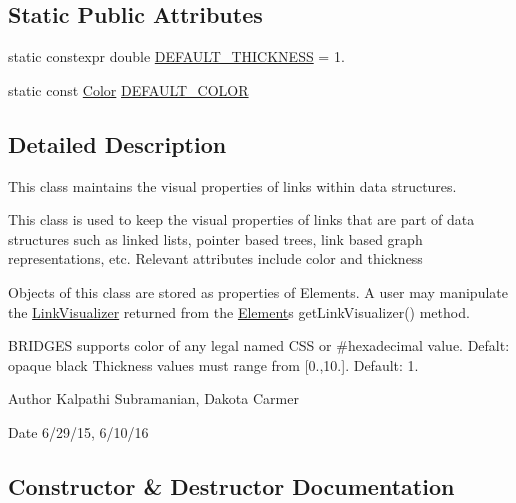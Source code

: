 \subsection*{Static Public Attributes}
\begin{DoxyCompactItemize}
\item 
static constexpr double \mbox{\hyperlink{classbridges_1_1_link_visualizer_ab790c33080c769008114db34d5ec8950}{D\+E\+F\+A\+U\+L\+T\+\_\+\+T\+H\+I\+C\+K\+N\+E\+SS}} = 1.
\item 
static const \mbox{\hyperlink{classbridges_1_1_color}{Color}} \mbox{\hyperlink{classbridges_1_1_link_visualizer_a7698ad5b243041377d81152a339d1282}{D\+E\+F\+A\+U\+L\+T\+\_\+\+C\+O\+L\+OR}}
\end{DoxyCompactItemize}


\subsection{Detailed Description}
This class maintains the visual properties of links within data structures. 

This class is used to keep the visual properties of links that are part of data structures such as linked lists, pointer based trees, link based graph representations, etc. Relevant attributes include color and thickness

Objects of this class are stored as properties of Elements. A user may manipulate the \mbox{\hyperlink{classbridges_1_1_link_visualizer}{Link\+Visualizer}} returned from the \mbox{\hyperlink{classbridges_1_1_element}{Element}}\textquotesingle{}s get\+Link\+Visualizer() method.

B\+R\+I\+D\+G\+ES supports color of any legal named C\+SS or \#hexadecimal value. Defalt\+: opaque black Thickness values must range from \mbox{[}0.,10.\mbox{]}. Default\+: 1.

\begin{DoxyAuthor}{Author}
Kalpathi Subramanian, Dakota Carmer 
\end{DoxyAuthor}
\begin{DoxyDate}{Date}
6/29/15, 6/10/16 
\end{DoxyDate}


\subsection{Constructor \& Destructor Documentation}
\mbox{\label{classbridges_1_1_link_visualizer_a598a773822efc55c644462795faf534f}} 
